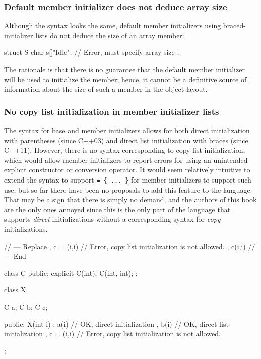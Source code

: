 \subsubsection[Default member initializer does not deduce array size]{Default member initializer does not deduce array size}\label{default-member-initializer-does-not-deduce-array-size}

Although the syntax looks the same, default member initializers using
braced-initializer lists do not deduce the size of an array member:

\begin{emcppslisting}
struct S
{
    char s[]{"Idle"};  // Error, must specify array size
};
\end{emcppslisting}
    

\noindent The rationale is that there is no guarantee that the default member
initializer will be used to initialize the member; hence, it cannot be a
definitive source of information about the size of such a member in the
object layout.

\subsubsection[No copy list initialization in member initializer lists]{No copy list initialization in member initializer lists}\label{no-copy-list-initialization-in-member-initializer-lists}

The syntax for base and member initializers allows for both direct
initialization with parentheses (since C++03) and direct list
initialization with braces (since C++11). However, there is no syntax
corresponding to copy list initialization, which would allow member
initializers to report errors for using an unintended explicit
constructor or conversion operator. It would seem relatively intuitive
to extend the syntax to support
\lstinline!=!~\lstinline!{!~\lstinline!...!~\lstinline!}! for member initializers to
support such use, but so far there have been no proposals to add this
feature to the language. That may be a sign that there is simply no
demand, and the authors of this book are the only ones annoyed since
this is the only part of the language that supports \emph{direct}
initializations without a corresponding syntax for \emph{copy}
initializations.

\begin{emcppshiddenlisting}[emcppsbatch=e22]
// --- Replace
    , c = (i,i)  // Error, copy list initialization is not allowed.
    , c(i,i)
// --- End
\end{emcppshiddenlisting}
\begin{emcppslisting}[emcppsbatch=e22]
class C
{
public:
    explicit C(int);
    C(int, int);
};

class X
{
    C a;
    C b;
    C c;

public:
    X(int i)
    : a(i)       // OK, direct initialization
    , b(i)       // OK, direct list initialization
    , c = (i,i)  // Error, copy list initialization is not allowed.
    {
    }
};
\end{emcppslisting}
    

